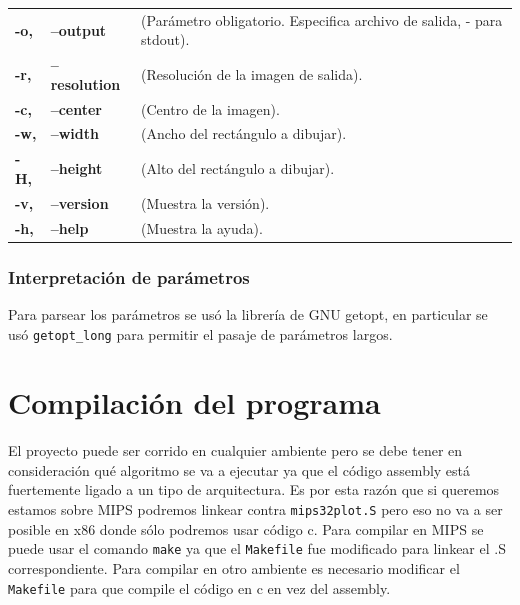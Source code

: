 \documentclass[a4paper,10pt,oneside]{article}
\begin{document}
\begin{ttfamily}
\begin{tabular}{lll}

\bf{-o,} & \bf{--output} &(Parámetro obligatorio. Especifica archivo de salida, - para stdout). \\
\bf{-r,} & \bf{--resolution} &(Resolución de la imagen de salida).\\
\bf{-c,} & \bf{--center} &(Centro de la imagen).\\
\bf{-w,} & \bf{--width} &(Ancho del rectángulo a dibujar).\\
\bf{-H,} & \bf{--height} &(Alto del rectángulo a dibujar).\\
\bf{-v,} & \bf{--version} 	&(Muestra la versión).\\
\bf{-h,} & \bf{--help} &(Muestra la ayuda).\\
\end{tabular}
\end{ttfamily}

\subsubsection{Interpretación de parámetros}
Para parsear los parámetros se usó la librería de GNU getopt, en particular se usó \texttt{getopt\_long} para permitir el pasaje de parámetros largos.
			
	\section{Compilación del programa}
	El proyecto puede ser corrido en cualquier ambiente pero se debe tener en consideración qué algoritmo se va a ejecutar ya que el código assembly está fuertemente ligado a un tipo de arquitectura. Es por esta razón que si queremos estamos sobre MIPS podremos linkear contra \texttt{mips32plot.S} pero eso no va a ser posible en x86 donde sólo podremos usar código c.
	Para compilar en MIPS se puede usar el comando \texttt{make} ya que el \texttt{Makefile} fue modificado para linkear el .S correspondiente.
	Para compilar en otro ambiente es necesario modificar el \texttt{Makefile} para que compile el código en c en vez del assembly.
	
\end{document}
